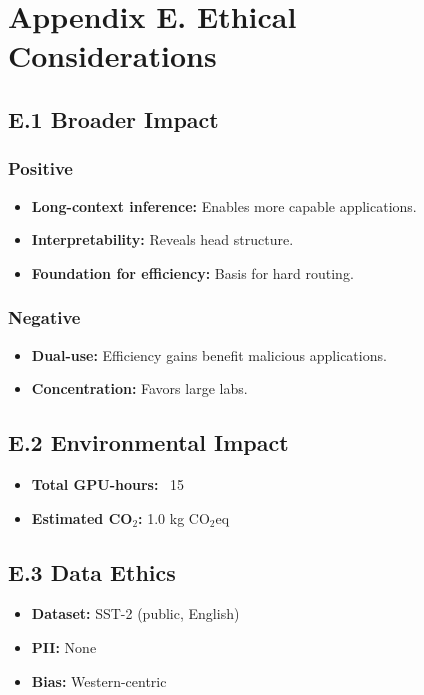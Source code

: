 
\section{Appendix E. Ethical Considerations}

\subsection{E.1 Broader Impact}

\subsubsection{Positive}
\begin{itemize}
\item \textbf{Long-context inference:} Enables more capable applications.
\item \textbf{Interpretability:} Reveals head structure.
\item \textbf{Foundation for efficiency:} Basis for hard routing.

\end{itemize}
\subsubsection{Negative}
\begin{itemize}
\item \textbf{Dual-use:} Efficiency gains benefit malicious applications.
\item \textbf{Concentration:} Favors large labs.

\end{itemize}
\subsection{E.2 Environmental Impact}

\begin{itemize}
\item \textbf{Total GPU-hours:} ~15
\item \textbf{Estimated CO$_2$:} 1.0 kg CO$_2$eq

\end{itemize}
\subsection{E.3 Data Ethics}

\begin{itemize}
\item \textbf{Dataset:} SST-2 (public, English)
\item \textbf{PII:} None
\item \textbf{Bias:} Western-centric

\end{itemize}
